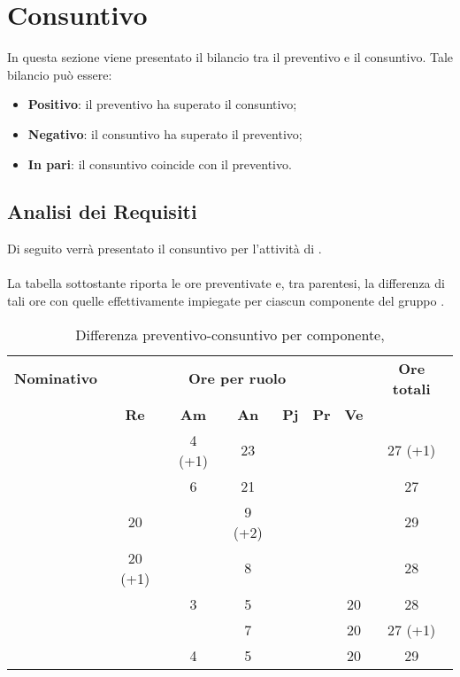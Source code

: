 \section{Consuntivo}
In questa sezione viene presentato il bilancio tra il preventivo e il consuntivo. Tale bilancio può essere:
\begin{itemize}
	\item \textbf{Positivo}: il preventivo ha superato il consuntivo;
	\item \textbf{Negativo}: il consuntivo ha superato il preventivo;
	\item \textbf{In pari}: il consuntivo coincide con il preventivo.
\end{itemize}

\subsection{Analisi dei Requisiti}
Di seguito verrà presentato il consuntivo per l'attività di \textit{\AdR}.
\\\\
La tabella sottostante riporta le ore preventivate e, tra parentesi, la differenza di tali ore con quelle effettivamente impiegate per ciascun componente del gruppo \gruppo.

\begin{table}[H]
	\begin{center}
		\begin{tabular}{|c|c|c|c|c|c|c|c|}
			\hline
			\textbf{Nominativo} & \multicolumn{6}{c|}{\textbf{Ore per ruolo}} & \textbf{Ore totali} \\
			& \textbf{Re} & \textbf{Am} & \textbf{An} & \textbf{Pj} & \textbf{Pr} & \textbf{Ve} & \\
			\hline	
			\FB		&			&	4 (+1)	&	23		&		&		&		&	27 (+1)	\\
			\hline
			\AF		&			&	6 		&	21		&	 	&		&		& 	27		\\
			\hline
			\GN		&	20		&			&	9 (+2)	&		&		&		&	29		\\
			\hline
			\GR		&	20 (+1)	&	 		&	8 		&		&	 	& 		&	28		\\
			\hline
			\SM 	&			&	3		&	5		&		&		& 	20	&	28		\\
			\hline
			\MP		& 			&			&	7		&		&		&	20	&	27 (+1)	\\
			\hline
			\MV 	&			&	4		&	5		&		&		&	20	& 	29		\\
			\hline
		\end{tabular}
	\end{center}
	\caption{Differenza preventivo-consuntivo per componente, \AdR}
\end{table}

